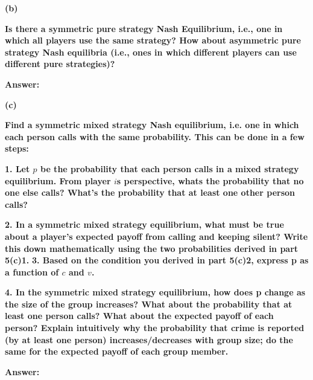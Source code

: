 \documentclass[letterpaper,11pt]{article}
\begin{document}
\begin{addmargin}[-1.1em]{0em}
\textbf{(b)}\par\end{addmargin}
        \textbf{Is there a symmetric pure strategy Nash Equilibrium, i.e., one in which all players use the same strategy? How about asymmetric pure strategy Nash equilibria (i.e., ones in which different players can use different pure strategies)?}\par
       \bigbreak
       \begin{addmargin}[-0.5em]{0em}
       \textbf{Answer: }\end{addmargin}



\begin{addmargin}[-1.1em]{0em}
\textbf{(c)}\par\end{addmargin}
\textbf{Find a symmetric mixed strategy Nash equilibrium, i.e. one in which each person calls with the same probability. This can be done in a few steps:}\par
\bigbreak
\textbf{1. Let $p$ be the probability that each person calls in a mixed strategy equilibrium. From player $i$\’s perspective, what\’s the probability that no one else calls? What’s the probability that at least one other person calls?}\par
\bigbreak
\textbf{2. In a symmetric mixed strategy equilibrium, what must be true about a player’s expected payoff from calling and keeping silent? Write this down mathematically using the two probabilities derived in part 5(c)1.}
\bigbreak
\textbf{3. Based on the condition you derived in part 5(c)2, express p as a function of $c$ and $v$.}\par
\bigbreak
\textbf{4. In the symmetric mixed strategy equilibrium, how does p change as the size of the group increases? What about the probability that at least one person calls? What about the expected payoff of each person? Explain intuitively why the probability that crime is reported (by at least one person) increases/decreases with group size; do the same for the expected payoff of each group member.}


\begin{addmargin}[-0.5em]{0em}
\textbf{Answer: }\end{addmargin}
\end{document}
